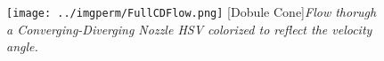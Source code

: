 \begin{figure}[H]
\centering
\texttt{[image: ../imgperm/FullCDFlow.png]}
[Dobule Cone]{\textit{Flow thorugh a Converging-Diverging Nozzle HSV colorized to reflect the velocity angle.}}
\label{fig:FullCDFlow}
\end{figure}
